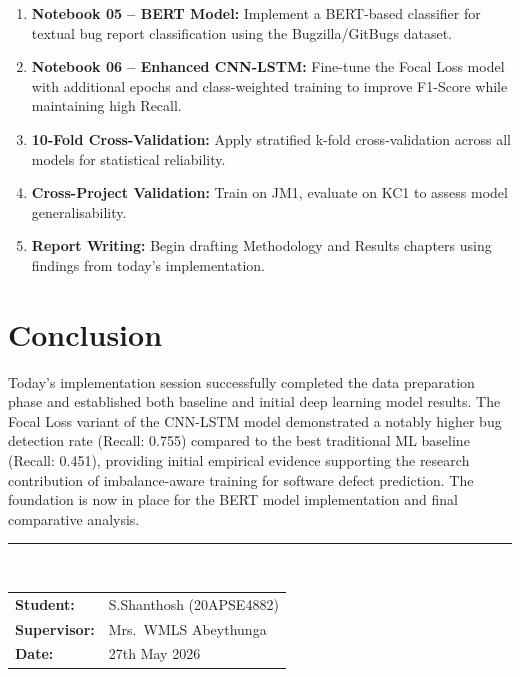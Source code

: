 \documentclass[12pt,a4paper]{article}
\begin{document}
\begin{enumerate}[leftmargin=1.5cm]
  \item \textbf{Notebook 05 -- BERT Model:} Implement a BERT-based
    classifier for textual bug report classification using the
    Bugzilla/GitBugs dataset.
  \item \textbf{Notebook 06 -- Enhanced CNN-LSTM:} Fine-tune the
    Focal Loss model with additional epochs and class-weighted
    training to improve F1-Score while maintaining high Recall.
  \item \textbf{10-Fold Cross-Validation:} Apply stratified k-fold
    cross-validation across all models for statistical reliability.
  \item \textbf{Cross-Project Validation:} Train on JM1, evaluate
    on KC1 to assess model generalisability.
  \item \textbf{Report Writing:} Begin drafting Methodology and
    Results chapters using findings from today's implementation.
\end{enumerate}

\section{Conclusion}

Today's implementation session successfully completed the data
preparation phase and established both baseline and initial deep
learning model results. The Focal Loss variant of the CNN-LSTM model
demonstrated a notably higher bug detection rate (Recall: 0.755)
compared to the best traditional ML baseline (Recall: 0.451),
providing initial empirical evidence supporting the research
contribution of imbalance-aware training for software defect
prediction. The foundation is now in place for the BERT model
implementation and final comparative analysis.

\vspace{1cm}
\noindent\rule{\linewidth}{0.5pt}\\[0.3cm]
\begin{tabular}{ll}
  \textbf{Student:}    & S.Shanthosh (20APSE4882) \\
  \textbf{Supervisor:} & Mrs.\ WMLS Abeythunga \\
  \textbf{Date:}       & 27th May 2026 \\
\end{tabular}
\end{document}
